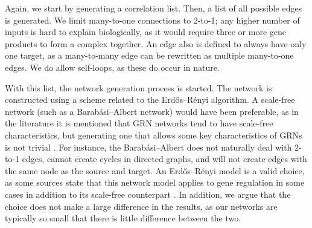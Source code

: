 \documentclass[../main.tex]{subfiles}
\begin{document}
Again, we start by generating a correlation list.
Then, a list of all possible edges is generated.
We limit many-to-one connections to 2-to-1; any higher number of inputs is hard to explain biologically, as it would require three or more gene products to form a complex together.
An edge also is defined to always have only one target, as a many-to-many edge can be rewritten as multiple many-to-one edges.
We do allow self-loops, as these do occur in nature.

With this list, the network generation process is started.
The network is constructed using a scheme related to the Erdős–Rényi algorithm.
A scale-free network (such as a Barabási–Albert network) would have been preferable, as in the literature it is mentioned that GRN networks tend to have scale-free characteristics, but generating one that allows some key characteristics of GRNs is not trivial \cite{teichmann2004gene}.
For instance, the Barabási–Albert does not naturally deal with 2-to-1 edges, cannot create cycles in directed graphs, and will not create edges with the same node as the source and target.
An Erdős–Rényi model is a valid choice, as some sources state that this network model applies to gene regulation in some cases in addition to its scale-free counterpart \cite{margolin2006aracne}.
In addition, we argue that the choice does not make a large difference in the results, as our networks are typically so small that there is little difference between the two.
\end{document}
